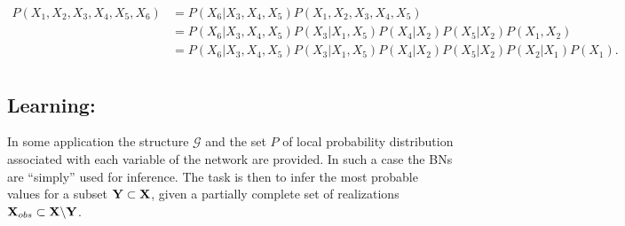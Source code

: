 \documentclass[a4paper,11pt]{report}
\begin{document}
{			\begin{equation*}
			  \begin{split}
			    P(X_{1},X_{2},X_{3},X_{4},X_{5},X_{6})
						&= P(X_{6} | X_{3},X_{4},X_{5}) P(X_{1},X_{2},X_{3},X_{4},X_{5}) \\
						&= P(X_{6} | X_{3},X_{4},X_{5}) P(X_{3} | X_{1},X_{5}) P(X_{4}| X_{2}) P(X_{5}| X_{2}) P(X_{1},X_{2})\\
						&= P(X_{6} | X_{3},X_{4},X_{5}) P(X_{3} | X_{1},X_{5}) P(X_{4}| X_{2}) P(X_{5}| X_{2}) P(X_{2}|X_{1}) P(X_{1}).\\
			  \end{split}
			  \label{eq:Eg BN CI}
			\end{equation*}
      

    \subsection{Learning:}
      \label{subseq:PGMs/BN/Learning}
      
      In some application the structure $\mathcal{G}$ and the set $P$ of local probability distribution associated with each variable of the network are provided. In such a case the BNs are ``simply'' used for inference. The task is then to infer the most probable values for a subset ${\bf Y} \subset {\bf X}$, given a partially complete set of realizations ${\bf X}_{obs} \subset {\bf X} \backslash {\bf Y}$.\\
      
}
\end{document}
